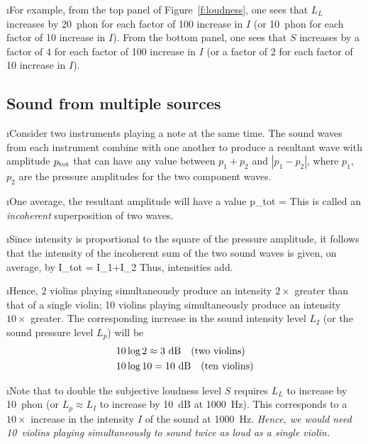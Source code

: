 \i For example, 
from the top panel of Figure~\ref{f:loudness},
one sees that $L_L$ increases by 20~phon for 
each factor of 100 increase in $I$ (or 10~phon
for each factor of 10 increase in $I$).
From the bottom panel, one sees that $S$ increases
by a factor of 4 for each factor of 100 increase in $I$
(or a factor of 2 for each factor of 10 increase in $I$).

\ei

\subsection{Sound from multiple sources}
\bi

\i Consider two instruments playing a note 
at the same time.
The sound waves from each instrument combine
with one another to produce a resultant wave 
with amplitude $p_{\rm tot}$ that can have 
any value between $p_1+p_2$ and $|p_1-p_2|$, 
where 
$p_1$, $p_2$ are the pressure amplitudes for
the two component waves.

\i One average, the resultant amplitude will 
have a value
%
\be
p_{\rm tot} = 
\ee
%
This is called an {\em incoherent} superposition
of two waves.

\i Since intensity is proportional to the
square of the pressure amplitude, it follows that the
intensity of the incoherent sum of the two sound waves
is given, on average, by
%
\be
I_{\rm tot} = I_1+I_2
\ee
%
Thus, intensities add.

\i Hence, 2 violins playing simultaneously produce
an intensity $2\times$ greater than that of a single
violin; 10 violins playing simultaneously produce
an intensity $10\times$ greater.
The corresponding increase in the sound intensity 
level $L_I$ (or the sound pressure level $L_p$) will be
%
\begin{align}
&10\log 2 \approx 3~{\rm dB}\quad({\rm two\ violins})
\\
&10\log 10 = 10~{\rm dB}\quad({\rm ten\ violins})
\end{align}
%

\i Note that to double the subjective loudness level $S$ 
requires $L_L$ to increase by 10~phon 
(or $L_p\approx L_I$ to increase by 10~dB at 1000~Hz).
This corresponds to a $10\times$ increase in the intensity $I$ 
of the sound at 1000~Hz.
{\em Hence, we would need 10~violins playing 
simultaneously to sound twice as loud as a single violin.}

